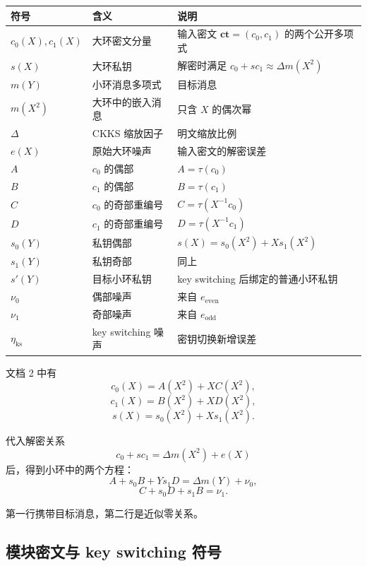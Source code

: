 \documentclass[11pt]{article}
\newcommand{\ct}{\mathbf{ct}}
\begin{document}
\begin{center}
\begin{tabular}{lll}
\toprule
符号 & 含义 & 说明 \\
\midrule
\(c_0(X),c_1(X)\) & 大环密文分量 & 输入密文 \(\ct=(c_0,c_1)\) 的两个公开多项式 \\
\(s(X)\) & 大环私钥 & 解密时满足 \(c_0+s c_1\approx \Delta m(X^2)\) \\
\(m(Y)\) & 小环消息多项式 & 目标消息 \\
\(m(X^2)\) & 大环中的嵌入消息 & 只含 \(X\) 的偶次幂 \\
\(\Delta\) & CKKS 缩放因子 & 明文缩放比例 \\
\(e(X)\) & 原始大环噪声 & 输入密文的解密误差 \\
\(A\) & \(c_0\) 的偶部 & \(A=\tau(c_0)\) \\
\(B\) & \(c_1\) 的偶部 & \(B=\tau(c_1)\) \\
\(C\) & \(c_0\) 的奇部重编号 & \(C=\tau(X^{-1}c_0)\) \\
\(D\) & \(c_1\) 的奇部重编号 & \(D=\tau(X^{-1}c_1)\) \\
\(s_0(Y)\) & 私钥偶部 & \(s(X)=s_0(X^2)+Xs_1(X^2)\) \\
\(s_1(Y)\) & 私钥奇部 & 同上 \\
\(s'(Y)\) & 目标小环私钥 & key switching 后绑定的普通小环私钥 \\
\(\nu_0\) & 偶部噪声 & 来自 \(e_{\mathrm{even}}\) \\
\(\nu_1\) & 奇部噪声 & 来自 \(e_{\mathrm{odd}}\) \\
\(\eta_{\mathrm{ks}}\) & key switching 噪声 & 密钥切换新增误差 \\
\bottomrule
\end{tabular}
\end{center}

文档 2 中有
\[
c_0(X)=A(X^2)+XC(X^2),
\]
\[
c_1(X)=B(X^2)+XD(X^2),
\]
\[
s(X)=s_0(X^2)+Xs_1(X^2).
\]

代入解密关系
\[
c_0+s c_1=\Delta m(X^2)+e(X)
\]
后，得到小环中的两个方程：
\[
A+s_0B+Y s_1D=\Delta m(Y)+\nu_0,
\]
\[
C+s_0D+s_1B=\nu_1.
\]

第一行携带目标消息，第二行是近似零关系。

\subsection{模块密文与 key switching 符号}
\end{document}
